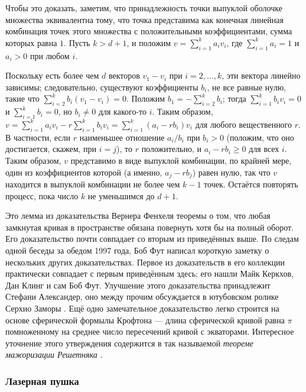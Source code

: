 Чтобы это доказать, заметим, что принадлежность точки выпуклой оболочке множества
эквивалентна тому, что точка представима как конечная линейная комбинация точек этого множества с положительными коэффициентами, сумма которых равна $1$.
Пусть $k>d+1$, и положим $v=\sum_{i=1}^k a_iv_i$, где $\sum_{i=1}^k a_i=1$ и $a_i>0$ при любом $i$.

Поскольку есть более чем $d$ векторов $v_1-v_i$ при $i=2,\dots,k$, эти вектора линейно зависимы;
следовательно, существуют коэффициенты $b_i$, не все равные нулю, такие что $\sum_{i=2}^k b_i(v_1-v_i)=0$.
Положим $b_1=-\sum_{i=2}^k b_i$; тогда $\sum_{i=1}^k b_i v_i=0$ и $\sum_{i=1}^k b_i=0$, но $b_i\ne 0$ для какого-то $i$.
Таким образом, $v=\sum_{i=1}^k a_iv_i-r\sum_{i=1}^k b_iv_i=\sum_{i=1}^k (a_i-rb_i)v_i$ для любого вещественного $r$.
В частности, если $r$ наименьшее отношение $a_i/b_i$  при $b_i>0$ (положим, что оно достигается, скажем, при $i=j$), то $r$ положительно, и $a_i-rb_i\ge0$ для всех $i$.
Таким образом, $v$ представимо в виде выпуклой комбинации, по крайней мере, один из коэффициентов которой (а именно, $a_j-rb_j$) равен нулю, так что $v$ находится в выпуклой комбинации не более чем $k-1$ точек.
Остаётся повторять процесс, пока число $k$ не уменьшимся до $d+1$.

\begin{addedbytheeditors}
Это лемма из доказательства Вернера Фенхеля \cite[Satz I$'$]{fenchel} теоремы о том, что любая замкнутая кривая в пространстве обязана повернуть хотя бы на полный оборот.
Его доказательство почти совпадает со вторым из приведённых выше.
По следам одной беседы за обедом 1997 года, Боб Фут написал короткую заметку о нескольких других доказательствах.
Первое из доказательств в его коллекции практически совпадает с первым приведённым здесь;
его нашли Майк Керкхов, Дан Клинг и сам Боб Фут.
Улучшение этого доказательства принадлежит Стефани Александер, оно между прочим обсуждается в ютубовском ролике Серхио Заморы \cite{zamora}.
Ещё одно замечательное доказательство легко строится на основе сферической формылы Крофтона --- длина сферической кривой равна $\pi$ помноженному на среднее число пересечений кривой с экваторами.
Интересное уточнение этого утверждения содержится в так называемой \emph{теореме мажоризации Решетняка} \cite{reshetnyak}.
\end{addedbytheeditors}

\subsubsection*{Лазерная пушка}

